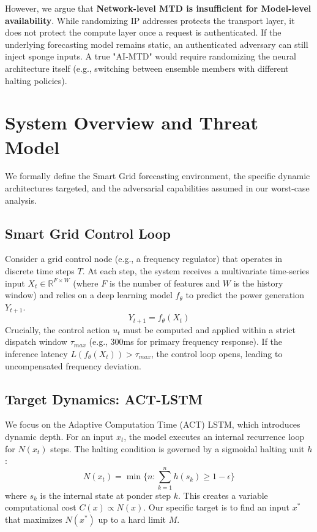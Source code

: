 \documentclass[conference]{IEEEtran}
\begin{document}
However, we argue that \textbf{Network-level MTD is insufficient for Model-level availability}. While randomizing IP addresses protects the transport layer, it does not protect the compute layer once a request is authenticated. If the underlying forecasting model remains static, an authenticated adversary can still inject sponge inputs. A true "AI-MTD" would require randomizing the neural architecture itself (e.g., switching between ensemble members with different halting policies).

\section{System Overview and Threat Model}
\label{sec:threat_model}

We formally define the Smart Grid forecasting environment, the specific dynamic architectures targeted, and the adversarial capabilities assumed in our worst-case analysis.

\subsection{Smart Grid Control Loop}
Consider a grid control node (e.g., a frequency regulator) that operates in discrete time steps $T$. At each step, the system receives a multivariate time-series input $X_t \in \mathbb{R}^{F \times W}$ (where $F$ is the number of features and $W$ is the history window) and relies on a deep learning model $f_\theta$ to predict the power generation $Y_{t+1}$.
\begin{equation}
    Y_{t+1} = f_\theta(X_t)
\end{equation}
Crucially, the control action $u_t$ must be computed and applied within a strict dispatch window $\tau_{max}$ (e.g., 300ms for primary frequency response). If the inference latency $L(f_\theta(X_t)) > \tau_{max}$, the control loop opens, leading to uncompensated frequency deviation.

\subsection{Target Dynamics: ACT-LSTM}
We focus on the Adaptive Computation Time (ACT) LSTM, which introduces dynamic depth. For an input $x_t$, the model executes an internal recurrence loop for $N(x_t)$ steps. The halting condition is governed by a sigmoidal halting unit $h$:
\begin{equation}
    N(x_t) = \min \{ n : \sum_{k=1}^{n} h(s_k) \ge 1 - \epsilon \}
\end{equation}
where $s_k$ is the internal state at ponder step $k$. This creates a variable computational cost $C(x) \propto N(x)$. Our specific target is to find an input $x^*$ that maximizes $N(x^*)$ up to a hard limit $M$.
\end{document}
